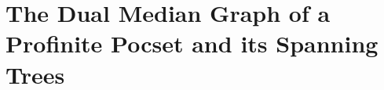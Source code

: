 \documentclass[reqno]{amsart}
\begin{document}


    \section{The Dual Median Graph of a Profinite Pocset and its Spanning Trees}
\end{document}
